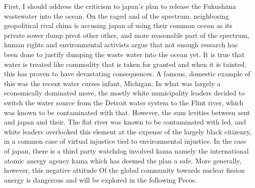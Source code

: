 \documentclass[12pt,letterpaper]{article}
\begin{document}
\begin{flushleft}
First, I should address the criticism to japan's plan to release the Fukushima wastewater into the ocean. On the raged and of the spectrum, neighboring geopolitical rival china is accusing japan of using their common ocean as its private sower dump pivot other other, and more reasonable part of the spectrum, human rights and environmental activists argue that not enough research has been done to justify dumping the waste water into the ocean yet. It is true that water is treated like commodity that is taken for granted and when it is tainted, this has proven to have devastating consequences. A famous, domestic example of this was the recent water curses infant, Michigan. In what was largely a economically dominated move, the mostly white municipality leaders decided to switch the water source from the Detroit water system to the Flint river, which was known to be contaminated with that. However, the sum levities between sent and japan and their. The flat river was known to be contaminated with led, and white leaders overlooked this element at the expense of the largely black citizenry, in a common case of virtual injustice tied to environmental injustice. In the case of japan, there is a third party watchdog involved kama namely the international atomic anergy agency kama which has deemed the plan a safe. More generally, however, this negative attitude Of the global community towards nuclear fission anergy is dangerous and will be explored in the following Pecos.


\end{flushleft}
\end{document}
